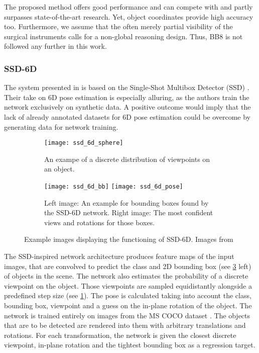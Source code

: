The proposed method offers good performance and can compete with and partly surpasses state-of-the-art research. Yet, object coordinates provide high accuracy too. Furthermore, we assume that the often merely partial visibility of the surgical instruments calls for a non-global reasoning design. Thus, BB8 is not followed any further in this work.

\subsubsection{SSD-6D}

The system presented in \cite{ssd-6d} is based on the Single-Shot Multibox Detector (SSD) \cite{ssd}. Their take on 6D pose estimation is especially alluring, as the authors train the network exclusively on synthetic data. A positive outcome would imply that the lack of already annotated datasets for 6D pose estimation could be overcome by generating data for network training. 

\begin{figure}[!tbp]
	\centering
	\begin{subfigure}[b]{0.3\textwidth}
		\centering
    	\texttt{[image: ssd\_6d\_sphere]}
    	\caption{An exampe of a discrete distribution of viewpoints on an object.}
    	\label{fig:ssd6d_viewpoints}
	\end{subfigure}
	\hfill
	\begin{subfigure}[b]{0.6\textwidth}
		\centering
    	\texttt{[image: ssd\_6d\_bb]}
    	\texttt{[image: ssd\_6d\_pose]}
    	\caption{Left image: An example for bounding boxes found by the SSD-6D network. Right image: The most confident views and rotations for those boxes.}
    	\label{fig:ssd6d_detection}
	\end{subfigure}
	\caption{Example images displaying the functioning of SSD-6D. Images from \cite{ssd-6d}}
\end{figure}

The SSD-inspired network architecture produces feature maps of the input images, that are convolved to predict the class and 2D bounding box (see \fig \ref{fig:ssd6d_detection} left) of objects in the scene. The network also estimates the probability of a discrete viewpoint on the object. Those viewpoints are sampled equidistantly alongside a predefined step size (see \fig \ref{fig:ssd6d_viewpoints}). The pose is calculated taking into account the class, bounding box, viewpoint and a guess on the in-plane rotation of the object. The network is trained entirely on images from the MS COCO dataset \cite{mscoco}. The objects that are to be detected are rendered into them with arbitrary translations and rotations. For each transformation, the network is given the closest discrete viewpoint, in-plane rotation and the tightest bounding box as a regression target.

